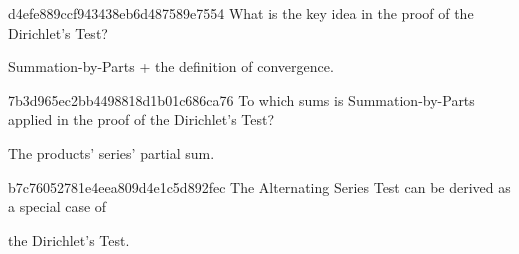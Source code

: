 \begin{note}{d4efe889ccf943438eb6d487589e7554}
    What is the key idea in the proof of the Dirichlet's Test?

    \begin{cloze}{1}
        Summation-by-Parts + the definition of convergence.
    \end{cloze}
\end{note}

\begin{note}{7b3d965ec2bb4498818d1b01c686ca76}
    To which sums is Summation-by-Parts applied in the proof of the Dirichlet's Test?

    \begin{cloze}{1}
        The products' series' partial sum.
    \end{cloze}
\end{note}

\begin{note}{b7c76052781e4eea809d4e1c5d892fec}
    The Alternating Series Test can be derived as a special case of \begin{icloze}{1}the Dirichlet's Test.\end{icloze}
\end{note}



